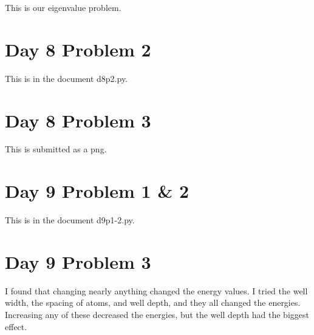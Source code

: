 \documentclass{article}
\begin{document}
This is our eigenvalue problem.

\section{Day 8 Problem 2}

This is in the document d8p2.py.

\section{Day 8 Problem 3}

This is submitted as a png.

\section{Day 9 Problem 1 \& 2}

This is in the document d9p1-2.py.

\section{Day 9 Problem 3}

I found that changing nearly anything changed the energy values. I tried the well width, the spacing of atoms, and well depth, and they all changed the energies. Increasing any of these decreased the energies, but the well depth had the biggest effect.
\end{document}
